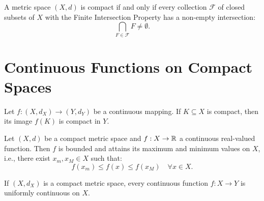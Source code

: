 \begin{theorem}
A metric space $(X,d)$ is compact if and only if every collection $\mathcal{F}$ of closed subsets of $X$ with the Finite Intersection Property has a non-empty intersection:
\[
\bigcap_{F \in \mathcal{F}} F \neq \emptyset.
\]
\end{theorem}


\section{Continuous Functions on Compact Spaces}
\label{sec:continuous_compact}

\begin{theorem}
Let $f: (X, d_X) \to (Y, d_Y)$ be a continuous mapping. If $K \subseteq X$ is compact, then its image $f(K)$ is compact in $Y$.
\end{theorem}

\begin{theorem}
Let $(X,d)$ be a compact metric space and $f: X \to \mathbb{R}$ a continuous real-valued function. Then $f$ is bounded and attains its maximum and minimum values on $X$, i.e., there exist $x_m, x_M \in X$ such that:
\[
f(x_m) \le f(x) \le f(x_M) \quad \forall x \in X.
\]
\end{theorem}

\begin{theorem}
If $(X, d_X)$ is a compact metric space, every continuous function $f: X \to Y$ is uniformly continuous on $X$.
\end{theorem}
